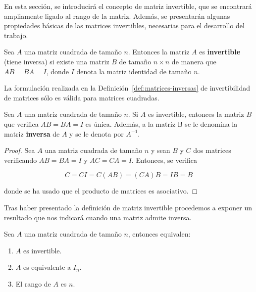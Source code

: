 En esta sección, se introducirá el concepto de matriz invertible, que se encontrará ampliamente ligado al rango de la matriz. Además, se presentarán algunas propiedades básicas de las matrices invertibles, necesarias para el desarrollo del trabajo.

\begin{definicion}\label{def:matrices-inversas}
    Sea $A$ una matriz cuadrada de tamaño $n$. Entonces la matriz $A$ es \textbf{invertible} (tiene inversa) si existe una matriz $B$ de tamaño $n \times n$ de manera que $AB = BA = I$, donde $I$ denota la matriz identidad de tamaño $n$.\newline
\end{definicion}

\begin{observacion}
    La formulación realizada en la Definición~\ref{def:matrices-inversas} de invertibilidad de matrices sólo es válida para matrices cuadradas.\newline
\end{observacion}

\begin{corolario}\label{cor:inversa-unica}
    Sea $A$ una matriz cuadrada de tamaño $n$. Si $A$ es invertible, entonces la matriz $B$ que verifica $AB = BA = I$ es única. Además, a la matriz B se le denomina la matriz \textbf{inversa} de $A$ y se le denota por $A^{-1}$.
\end{corolario}

\begin{proof}
    Sea $A$ una matriz cuadrada de tamaño $n$ y sean $B$ y $C$ dos matrices verificando $AB = BA = I$ y $AC = CA = I$. Entonces, se verifica

    \[ C = CI = C(AB) = (CA)B = IB = B\]

    donde se ha usado que el producto de matrices es asociativo.\newline
\end{proof}

Tras haber presentado la definición de matriz invertible procedemos a exponer un resultado que nos indicará cuando una matriz admite inversa.

\begin{teorema}
    Sea $A$ una matriz cuadrada de tamaño $n$, entonces equivalen:

    \begin{enumerate}
        \item $A$ es invertible.
        \item $A$ es equivalente a $I_n$.
        \item El rango de $A$ es $n$.
    \end{enumerate}
\end{teorema}

